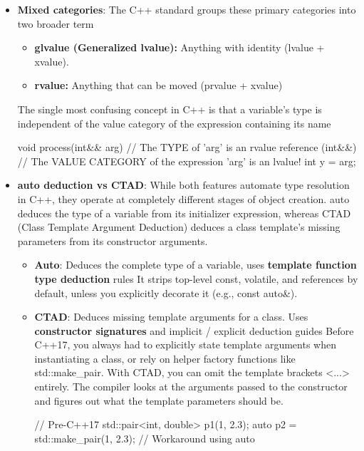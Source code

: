 \documentclass{report}
\begin{document}
\begin{itemize}
\begin{itemize}
            \end{itemize}
        \item \textbf{Mixed categories}: The C++ standard groups these primary categories into two broader term
            \begin{itemize}
                \item \textbf{glvalue (Generalized lvalue):} Anything with identity (lvalue + xvalue).
                \item \textbf{rvalue:} Anything that can be moved (prvalue + xvalue)
            \end{itemize}
            The single most confusing concept in C++ is that a variable's type is independent of the value category of the expression containing its name
            \bigbreak \noindent 
            \begin{cppcode}
                void process(int&& arg) {
                    // The TYPE of 'arg' is an rvalue reference (int&&)
                    // The VALUE CATEGORY of the expression 'arg' is an lvalue!
                    int y = arg; 
                }
            \end{cppcode}
        \item \textbf{auto deduction vs CTAD}: While both features automate type resolution in C++, they operate at completely different stages of object creation. auto deduces the type of a variable from its initializer expression, whereas CTAD (Class Template Argument Deduction) deduces a class template’s missing parameters from its constructor arguments.
            \begin{itemize}
                \item \textbf{Auto}: Deduces the complete type of a variable, uses \textbf{template function type deduction} rules
                    \bigbreak \noindent 
                    It strips top-level const, volatile, and references by default, unless you explicitly decorate it (e.g., const auto\&).
                \item \textbf{CTAD}: Deduces missing template arguments for a class. Uses \textbf{constructor signatures} and implicit / explicit deduction guides
                    \bigbreak \noindent 
                    Before C++17, you always had to explicitly state template arguments when instantiating a class, or rely on helper factory functions like std::make\_pair.
                    \bigbreak \noindent 
                    With CTAD, you can omit the template brackets <...> entirely. The compiler looks at the arguments passed to the constructor and figures out what the template parameters should be.
                    \bigbreak \noindent 
                    \begin{cppcode}
                        // Pre-C++17
                        std::pair<int, double> p1(1, 2.3); 
                        auto p2 = std::make_pair(1, 2.3); // Workaround using auto


\end{cppcode}
\end{itemize}
\end{itemize}
\end{document}
